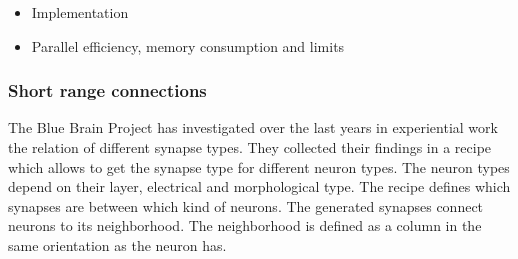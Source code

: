 \documentclass[a4paper]{article}
\begin{document}
   \begin{itemize}
      \item Implementation
      \item Parallel efficiency, memory consumption and limits
   \end{itemize}
   
\subsubsection{Short range connections}
The Blue Brain Project has investigated over the last years in experiential work the relation of different synapse types.
They collected their findings in a recipe which allows to get the synapse type for different neuron types.
The neuron types depend on their layer, electrical and morphological type. The recipe defines which synapses are between 
which kind of neurons. The generated synapses connect neurons to its neighborhood. The neighborhood is defined as a
column in the same orientation as the neuron has.
\end{document}
